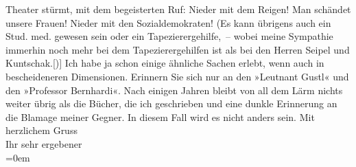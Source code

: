 \begin{ledgroupsized}[t]{13cm}
               Theater stürmt, mit dem begeisterten Ruf: Nieder mit dem Reigen! Man schändet unsere
               Frauen! Nieder mit den Sozialdemokraten! (Es kann übrigens auch ein Stud. med.
               gewesen sein oder ein Tapezierergehilfe, – wobei meine Sympathie immerhin noch mehr
               bei dem Tapezierergehilfen ist als bei den Herren Seipel und Kuntschak.{[}){]} Ich habe ja schon einige ähnliche Sachen
               erlebt, wenn auch in bescheideneren Dimensionen. Erinnern Sie sich nur an den »Leutnant Gustl« und den »Professor Bernhardi«. Nach einigen Jahren bleibt von all dem
               Lärm nichts weiter übrig als die Bücher, die ich geschrieben und eine dunkle
               Erinnerung an die Blamage meiner Gegner. In diesem Fall wird es nicht anders
               sein.\pend
           \pstart
           Mit herzlichem Gruss{\\[\baselineskip]}Ihr sehr ergebener{\\[\baselineskip]}\pend
           \leftskip=0em{}\endnumbering{}\end{ledgroupsized}  \newcommand{\dateiname}{L02363}\newcommand{\titel}{Arthur Schnitzler an Stefan Großmann, 17. 2. 1921}\newcommand{\editorInnen}{Martin Anton Müller und Gerd-Hermann Susen}
      